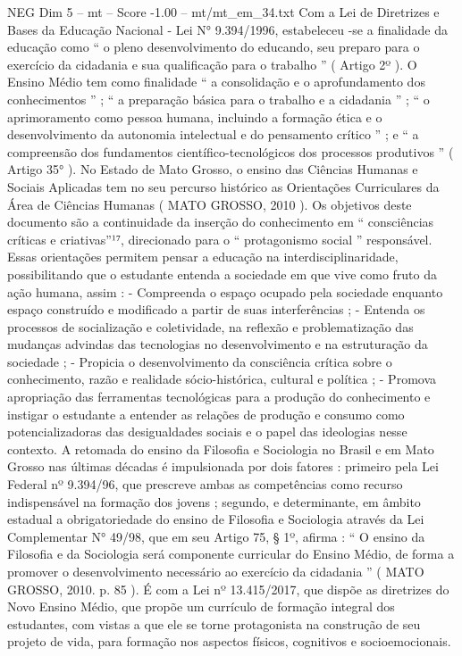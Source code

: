 \begin{textsample}{NEG Dim 5 – mt – Score -1.00 – mt/mt\_em\_34.txt}
Com a Lei de Diretrizes e Bases da Educação Nacional - Lei N{\EmojiFont °} 9.394/1996, estabeleceu -se a finalidade da educação como “ o pleno desenvolvimento do educando, seu preparo para o exercício da cidadania e sua qualificação para o trabalho ” ( Artigo 2º ).
O Ensino Médio tem como finalidade “ a consolidação e o aprofundamento dos conhecimentos ” ; “ a preparação básica para o trabalho e a cidadania ” ; “ o aprimoramento como pessoa humana, incluindo a formação ética e o desenvolvimento da autonomia intelectual e do pensamento crítico ” ; e “ a compreensão dos fundamentos científico-tecnológicos dos processos produtivos ” ( Artigo 35{\EmojiFont °} ).
No Estado de Mato Grosso, o ensino das Ciências Humanas e Sociais Aplicadas tem no seu percurso histórico as Orientações Curriculares da Área de Ciências Humanas ( MATO GROSSO, 2010 ).
Os objetivos deste documento são a continuidade da inserção do conhecimento em “ consciências críticas e criativas”¹⁷, direcionado para o “ protagonismo social ” responsável.
Essas orientações permitem pensar a educação na interdisciplinaridade, possibilitando que o estudante entenda a sociedade em que vive como fruto da ação humana, assim : - Compreenda o espaço ocupado pela sociedade enquanto espaço construído e modificado a partir de suas interferências ; - Entenda os processos de socialização e coletividade, na reflexão e problematização das mudanças advindas das tecnologias no desenvolvimento e na estruturação da sociedade ; - Propicia o desenvolvimento da consciência crítica sobre o conhecimento, razão e realidade sócio-histórica, cultural e política ; - Promova apropriação das ferramentas tecnológicas para a produção do conhecimento e instigar o estudante a entender as relações de produção e consumo como potencializadoras das desigualdades sociais e o papel das ideologias nesse contexto.
A retomada do ensino da Filosofia e Sociologia no Brasil e em Mato Grosso nas últimas décadas é impulsionada por dois fatores : primeiro pela Lei Federal nº 9.394/96, que prescreve ambas as competências como recurso indispensável na formação dos jovens ; segundo, e determinante, em âmbito estadual a obrigatoriedade do ensino de Filosofia e Sociologia através da Lei Complementar N{\EmojiFont °} 49/98, que em seu Artigo 75, § 1º, afirma : “ O ensino da Filosofia e da Sociologia será componente curricular do Ensino Médio, de forma a promover o desenvolvimento necessário ao exercício da cidadania ” ( MATO GROSSO, 2010. p. 85 ).
É com a Lei nº 13.415/2017, que dispõe as diretrizes do Novo Ensino Médio, que propõe um currículo de formação integral dos estudantes, com vistas a que ele se torne protagonista na construção de seu projeto de vida, para formação nos aspectos físicos, cognitivos e socioemocionais.

\end{textsample}
